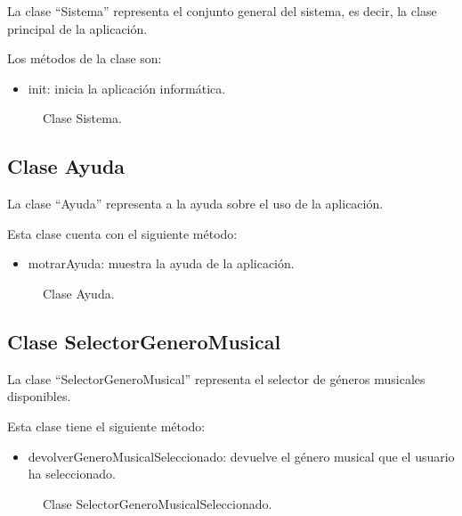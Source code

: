 La clase ``Sistema'' representa el conjunto general del sistema, es decir, la clase principal de la aplicación.

Los métodos de la clase son:

\begin{itemize}
    \item init: inicia la aplicación informática.
\end{itemize}

\begin{figure}[H]
  \centering
  
  \caption{Clase Sistema.}
\end{figure}


\subsection{Clase Ayuda}

La clase ``Ayuda'' representa a la ayuda sobre el uso de la aplicación.

Esta clase cuenta con el siguiente método:

\begin{itemize}
    \item motrarAyuda: muestra la ayuda de la aplicación.
\end{itemize}

\begin{figure}[H]
  \centering
  
  \caption{Clase Ayuda.}
\end{figure}

\subsection{Clase SelectorGeneroMusical}

La clase ``SelectorGeneroMusical'' representa el selector de géneros musicales disponibles.

Esta clase tiene el siguiente método:

\begin{itemize}
    \item devolverGeneroMusicalSeleccionado: devuelve el género musical que el usuario ha seleccionado.
\end{itemize}

\begin{figure}[H]
  \centering
  
  \caption{Clase SelectorGeneroMusicalSeleccionado.}
\end{figure}


